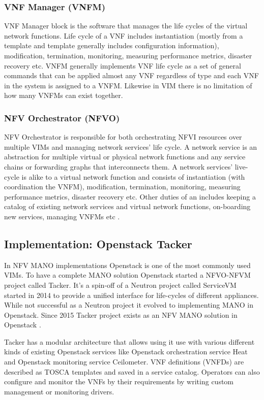 \documentclass[12pt,oneandhalf,chaparabic,ceng,ms,eng,oneside,pntc]{gsufbe}
\begin{document}
\subsubsection{VNF Manager (VNFM)}
VNF Manager block is the software that manages the life cycles of the virtual network functions.  Life
cycle of a VNF includes instantiation (mostly from a template and template generally includes
configuration information), modification, termination, monitoring, measuring performance metrics,
disaster recovery etc.  VNFM generally implements VNF life cycle as a set of general commands that can
be applied almost any VNF regardless of type and each VNF in the system is assigned to a VNFM.
Likewise in VIM there is no limitation of how many VNFMs can exist together.

\subsubsection{NFV Orchestrator (NFVO)}
NFV Orchestrator is responsible for both orchestrating NFVI resources over multiple VIMs and managing
network services' life cycle.  A network service is an abstraction for multiple virtual or physical
network functions and any service chains or forwarding graphs that interconnects them.  A network
services' live-cycle is alike to a virtual network function and consists of instantiation (with
coordination the VNFM), modification, termination, monitoring, measuring performance metrics, disaster
recovery etc.  Other duties of an includes keeping a catalog of existing network services and virtual
network functions, on-boarding new services, managing VNFMs etc \cite{gonzalez_dependability_2018}.

\subsection{Implementation: Openstack Tacker}
In NFV MANO implementations Openstack \cite{openstack} is one of the most commonly used VIMs.  To have
a complete MANO
solution Openstack started a NFVO-NFVM project called Tacker.  It's a spin-off of a Neutron project
called ServiceVM started in 2014 to provide a unified interface for life-cycles of different
appliances.  While not successful as a Neutron project it evolved to implementing MANO in Openstack.
Since 2015 Tacker project exists as an NFV MANO solution in Openstack \cite{tacker}.

Tacker has a modular architecture that allows using it use with various different kinds of
existing Openstack services like Openstack orchestration service Heat and Openstack monitoring service
Ceilometer.  VNF definitions (VNFDs) are described as TOSCA templates and saved in a service catalog.
Operators can also configure and monitor the VNFs by their requirements by writing custom management or
monitoring drivers.
\end{document}
